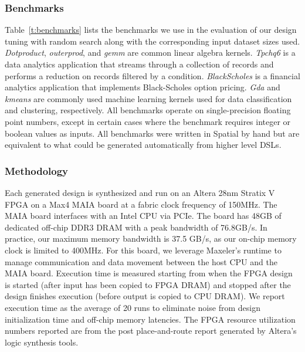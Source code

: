 \subsubsection{Benchmarks}
Table~\ref{t:benchmarks} lists the benchmarks we use in the evaluation of our
design tuning with random search along with the corresponding
input dataset sizes used. \emph{Dotproduct}, \emph{outerprod}, and \emph{gemm} are common
linear algebra kernels. \emph{Tpchq6} is a data analytics application that streams through a collection
of records and performs a reduction on records filtered by a condition. \emph{BlackScholes} is
a financial analytics application that implements Black-Scholes option pricing. \emph{Gda}
and \emph{kmeans}
are commonly used machine learning kernels used for data classification and clustering, respectively.
All benchmarks operate on single-precision floating point numbers,
except in certain cases where the benchmark requires integer or boolean values as inputs.
All benchmarks were written in Spatial by hand but are equivalent to what
could be generated automatically from higher level DSLs.

\subsubsection{Methodology}
Each generated design is synthesized and run on an Altera 28nm Stratix V FPGA
on a Max4 MAIA board at a fabric clock frequency of 150MHz. The MAIA board interfaces with an Intel CPU
via PCIe. The board has 48GB of dedicated off-chip DDR3 DRAM with a peak bandwidth of 76.8GB/s. In practice,
our maximum memory bandwidth is 37.5 GB/s, as our on-chip memory clock is limited to 400MHz.
For this board, we leverage Maxeler's runtime to manage communication and data movement
between the host CPU and the MAIA board.
Execution time is measured starting
from when the FPGA design is started (after input has been copied to FPGA DRAM) and stopped after
the design finishes execution (before output is copied to CPU DRAM). We report execution time as the
average of 20 runs to eliminate noise from design initialization time and off-chip memory latencies.
The FPGA resource utilization
numbers reported are from the post place-and-route report generated by Altera's logic synthesis tools.

